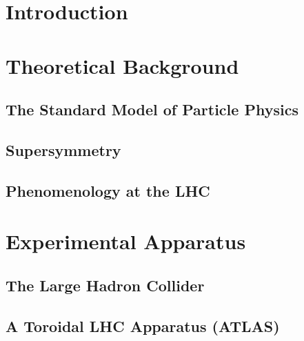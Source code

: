 \documentclass{outhesis}
\begin{document}
\chapter{Introduction}\label{chap:intro}
\graphicspath{{figures/intro/}}


\chapter{Theoretical Background}\label{chap:theory}
\graphicspath{{figures/theory/}}
\section{The Standard Model of Particle Physics}\label{sec:theory.sm}

\section{Supersymmetry}\label{sec:theory.susy}

\section{Phenomenology at the LHC}\label{sec:theory.pheno}


\chapter{Experimental Apparatus}\label{chap:exp}
\graphicspath{{figures/exp/}}
\section{The Large Hadron Collider}\label{sec:exp.lhc}

\section{A Toroidal LHC Apparatus (ATLAS)}\label{sec:exp.atlas}

\end{document}
